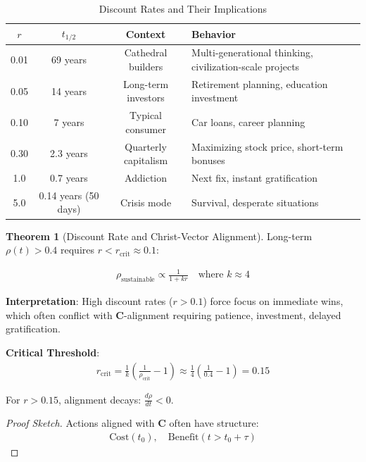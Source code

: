 \documentclass[11pt,a4paper]{article}
\theoremstyle{definition}
\newtheorem{theorem}{Theorem}[section]
\theoremstyle{remark}
\begin{document}
\begin{enumerate}
\begin{table}[H]
\centering
\caption{Discount Rates and Their Implications}
\label{tab:discount_rates}
\begin{tabular}{|c|c|c|p{6cm}|}
\hline
\textbf{\(r\)} & \textbf{\(t_{1/2}\)} & \textbf{Context} & \textbf{Behavior} \\
\hline
0.01 & 69 years & Cathedral builders & Multi-generational thinking, civilization-scale projects \\
\hline
0.05 & 14 years & Long-term investors & Retirement planning, education investment \\
\hline
0.10 & 7 years & Typical consumer & Car loans, career planning \\
\hline
0.30 & 2.3 years & Quarterly capitalism & Maximizing stock price, short-term bonuses \\
\hline
1.0 & 0.7 years & Addiction & Next fix, instant gratification \\
\hline
5.0 & 0.14 years (50 days) & Crisis mode & Survival, desperate situations \\
\hline
\end{tabular}
\end{table}

\begin{theorem}[Discount Rate and Christ-Vector Alignment]
Long-term \(\rho(t) > 0.4\) requires \(r < r_{\text{crit}} \approx 0.1\):

\begin{align}
\rho_{\text{sustainable}} \propto \frac{1}{1 + kr} \quad \text{where } k \approx 4
\end{align}

\textbf{Interpretation}: High discount rates (\(r > 0.1\)) force focus on immediate wins, which often conflict with \(\mathbf{C}\)-alignment requiring patience, investment, delayed gratification.

\textbf{Critical Threshold}:
\begin{align}
r_{\text{crit}} = \frac{1}{k}(\frac{1}{\rho_{\text{crit}}} - 1) \approx \frac{1}{4}(\frac{1}{0.4} - 1) = 0.15
\end{align}

For \(r > 0.15\), alignment decays: \(\frac{d\rho}{dt} < 0\).
\end{theorem}

\begin{proof}[Proof Sketch]
Actions aligned with \(\mathbf{C}\) often have structure:
\begin{align}
\text{Cost}(t_0), \quad \text{Benefit}(t > t_0 + \tau)
\end{align}


\end{proof}
\end{enumerate}
\end{document}

